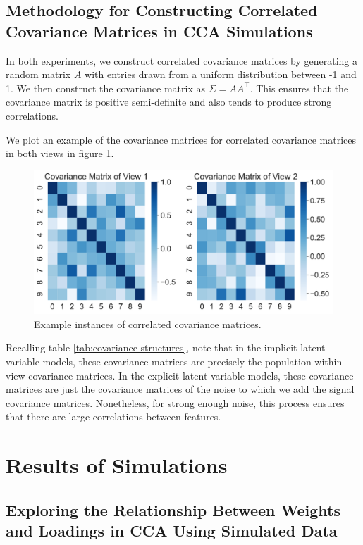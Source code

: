 \subsection{Methodology for Constructing Correlated Covariance Matrices in CCA Simulations}

In both experiments, we construct correlated covariance matrices by generating a random matrix $A$ with entries drawn from a uniform distribution between -1 and 1.
We then construct the covariance matrix as $\Sigma = AA^\top$.
This ensures that the covariance matrix is positive semi-definite and also tends to produce strong correlations.

We plot an example of the covariance matrices for correlated covariance matrices in both views in figure \ref{fig:covariance-matrices}.

\begin{figure}
    \centering
    \includegraphics[width=0.8\linewidth]{figures/simulated/explicit/True_Covariance_Correlated.pdf}
    \caption{Example instances of correlated covariance matrices.}\label{fig:covariance-matrices}
\end{figure}

Recalling table \ref{tab:covariance-structures}, note that in the implicit latent variable models, these covariance matrices are precisely the population within-view covariance matrices.
In the explicit latent variable models, these covariance matrices are just the covariance matrices of the noise to which we add the signal covariance matrices.
Nonetheless, for strong enough noise, this process ensures that there are large correlations between features.

\section{Results of Simulations}

\subsection{Exploring the Relationship Between Weights and Loadings in CCA Using Simulated Data}


